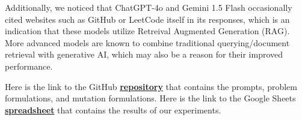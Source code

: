\documentclass[times, 10pt,twocolumn]{article}
\begin{document}
Additionally, we noticed that ChatGPT-4o and Gemini 1.5 Flash occasionally cited websites such as GitHub or LeetCode itself in its responses, which is an indication that these models utilize Retreival Augmented Generation (RAG). More advanced models are known to combine traditional querying/document retrieval with generative AI, which may also be a reason for their improved performance.




Here is the link to the GitHub \textbf{\href{https://github.com/JaykumarPatel4802/software-testing-project}{repository}} that contains the prompts, problem formulations, and mutation formulations. Here is the link to the Google Sheets \textbf{\href{https://docs.google.com/spreadsheets/d/11I5tJY4y23TiVjcQp0gYHosABqDVvtIG0WB7ye1b420/edit?usp=sharing}{spreadsheet}} that contains the results of our experiments.




\pagebreak
\end{document}
